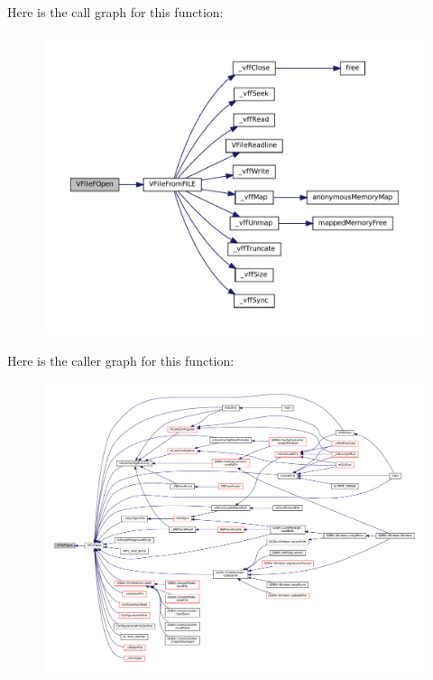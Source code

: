 Here is the call graph for this function\+:
\nopagebreak
\begin{figure}[H]
\begin{center}
\leavevmode
\includegraphics[width=350pt]{vfs-file_8c_a88c63b95e9d220a5584a0ce98a54c6c8_cgraph}
\end{center}
\end{figure}
Here is the caller graph for this function\+:
\nopagebreak
\begin{figure}[H]
\begin{center}
\leavevmode
\includegraphics[width=350pt]{vfs-file_8c_a88c63b95e9d220a5584a0ce98a54c6c8_icgraph}
\end{center}
\end{figure}
\mbox{\label{vfs-file_8c_a6f6240220a6b709b7f112e86590c0f68}} 
